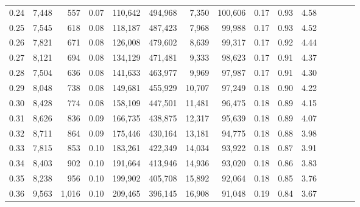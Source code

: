 \begin{tabular}{rrrcrrrrrrrrrrr}
0.24 &   7,448 &    557 &                                       0.07 &  110,642 &  494,968 &    7,350 &  100,606 &  0.17 &  0.93 &                         4.58 \\
0.25 &   7,545 &    618 &                                       0.08 &  118,187 &  487,423 &    7,968 &   99,988 &  0.17 &  0.93 &                         4.52 \\
0.26 &   7,821 &    671 &                                       0.08 &  126,008 &  479,602 &    8,639 &   99,317 &  0.17 &  0.92 &                         4.44 \\
0.27 &   8,121 &    694 &                                       0.08 &  134,129 &  471,481 &    9,333 &   98,623 &  0.17 &  0.91 &                         4.37 \\
0.28 &   7,504 &    636 &                                       0.08 &  141,633 &  463,977 &    9,969 &   97,987 &  0.17 &  0.91 &                         4.30 \\
0.29 &   8,048 &    738 &                                       0.08 &  149,681 &  455,929 &   10,707 &   97,249 &  0.18 &  0.90 &                         4.22 \\
0.30 &   8,428 &    774 &                                       0.08 &  158,109 &  447,501 &   11,481 &   96,475 &  0.18 &  0.89 &                         4.15 \\
0.31 &   8,626 &    836 &                                       0.09 &  166,735 &  438,875 &   12,317 &   95,639 &  0.18 &  0.89 &                         4.07 \\
0.32 &   8,711 &    864 &                                       0.09 &  175,446 &  430,164 &   13,181 &   94,775 &  0.18 &  0.88 &                         3.98 \\
0.33 &   7,815 &    853 &                                       0.10 &  183,261 &  422,349 &   14,034 &   93,922 &  0.18 &  0.87 &                         3.91 \\
0.34 &   8,403 &    902 &                                       0.10 &  191,664 &  413,946 &   14,936 &   93,020 &  0.18 &  0.86 &                         3.83 \\
0.35 &   8,238 &    956 &                                       0.10 &  199,902 &  405,708 &   15,892 &   92,064 &  0.18 &  0.85 &                         3.76 \\
0.36 &   9,563 &  1,016 &                                       0.10 &  209,465 &  396,145 &   16,908 &   91,048 &  0.19 &  0.84 &                         3.67 \\

\end{tabular}
